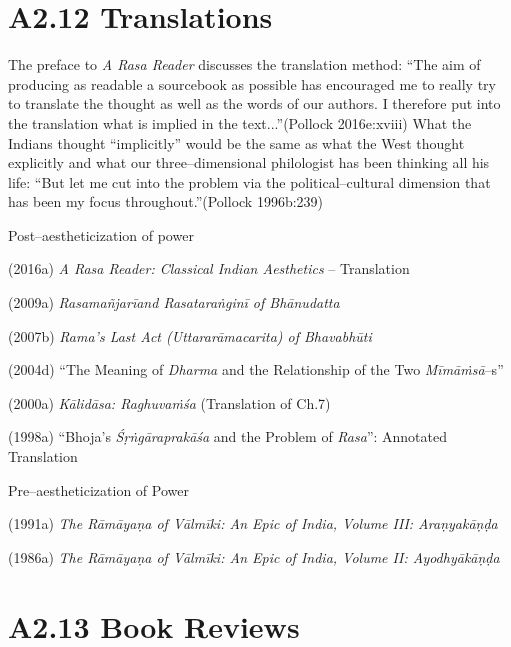 \section*{A2.12 Translations}

The preface to \textit{A Rasa Reader} discusses the translation method: “The aim of producing as readable a sourcebook as possible has encouraged me to really try to translate the thought as well as the words of our authors. I therefore put into the translation what is implied in the text...”(Pollock 2016e:xviii) What the Indians thought “implicitly” would be the same as what the West thought explicitly and what our three–dimensional philologist has been thinking all his life: “But let me cut into the problem via the political–cultural dimension that has been my focus throughout.”(Pollock 1996b:239)

Post–aestheticization of power

\item (2016a) \textit{A Rasa Reader: Classical Indian Aesthetics} – Translation

 \item (2009a) \textit{Rasamañjarīand Rasataraṅginī of Bhānudatta}

 \item (2007b) \textit{Rama's Last Act (Uttararāmacarita) of Bhavabhūti}

 \item (2004d) “The Meaning of \textit{Dharma} and the Relationship of the Two \textit{Mīmāṁsā}–s”

 \item (2000a) \textit{Kālidāsa: Raghuvaṁśa} (Translation of Ch.7)

 \item (1998a) “Bhoja's \textit{Śṛṅgāraprakāśa} and the Problem of \textit{Rasa}”: Annotated Translation

Pre–aestheticization of Power

\item (1991a) \textit{The Rāmāyaṇa of Vālmīki: An Epic of India, Volume III: Araṇyakāṇḍa}

 \item (1986a) \textit{The Rāmāyaṇa of Vālmīki: An Epic of India, Volume II: Ayodhyākāṇḍa }



\section*{A2.13 Book Reviews}

